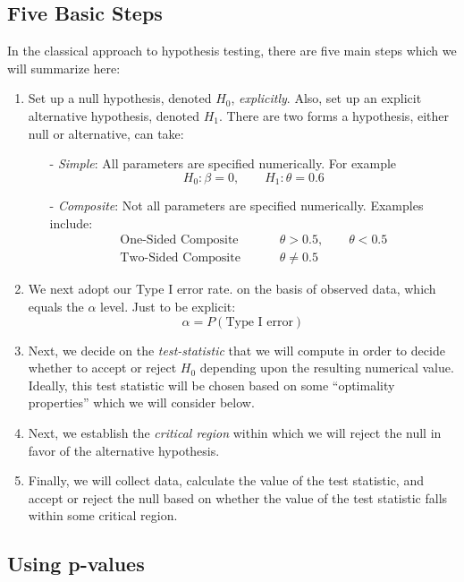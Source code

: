\documentclass[a4paper,12pt]{scrartcl}
\begin{document}
\subsection{Five Basic Steps}

In the classical approach to hypothesis testing, there are five
main steps which we will summarize here:
\begin{enumerate}
   \item Set up a null hypothesis, denoted $H_0$, \emph{explicitly}.
      Also, set up an explicit alternative hypothesis, denoted
      $H_1$. There are two forms a hypothesis, either null or 
      alternative, can take:
      \begin{itemize}
	 \item[-] {\sl Simple}: All parameters are specified 
	    numerically. For example 
	    \[ H_0: \beta = 0, \qquad H_1:\theta = 0.6\]
	 \item[-] {\sl Composite}: Not all parameters are specified
	    numerically. Examples include:
	    \begin{align*}
	       \text{One-Sided Composite } \qquad& \theta > 0.5,
	       \qquad \theta < 0.5\\
	       \text{Two-Sided Composite } \qquad& \theta \neq 0.5
	    \end{align*}
      \end{itemize}
   \item We next adopt our Type I error rate. 
      on the basis of observed data,  which equals the
      $\alpha$ level. Just to be explicit:
	 \[ \alpha = P(\text{Type I error}) \]
   \item Next, we decide on the \emph{test-statistic} that we 
      will compute in order to decide whether to accept or reject
      $H_0$ depending upon the resulting numerical value. Ideally, 
      this test statistic will be chosen based on some 
      ``optimality properties'' which we will consider below.
   \item Next, we establish the \emph{critical region} within
      which we will reject the null in favor of the alternative
      hypothesis. 
   \item Finally, we will collect data, calculate the value of the
      test statistic, and accept or reject the null based on
      whether the value of the test statistic falls within some
      critical region.
\end{enumerate}

\subsection{Using p-values}
\end{document}
